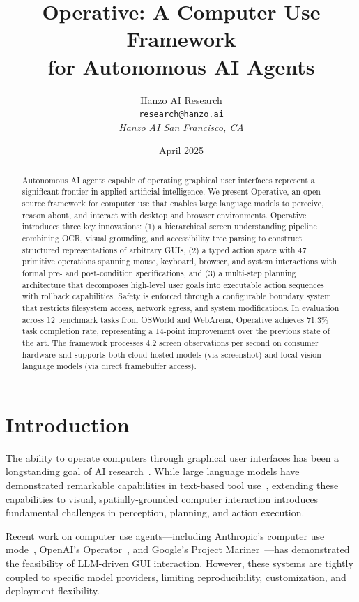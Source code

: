 \documentclass[11pt,twocolumn]{article}
\title{Operative: A Computer Use Framework\\for Autonomous AI Agents}
\author{Hanzo AI Research\\
\texttt{research@hanzo.ai}\\
\textit{Hanzo AI \quad San Francisco, CA}}
\date{April 2025}
\begin{document}
\luxcoverpage
\maketitle

\begin{abstract}
Autonomous AI agents capable of operating graphical user interfaces represent a significant frontier in applied artificial intelligence. We present Operative, an open-source framework for computer use that enables large language models to perceive, reason about, and interact with desktop and browser environments. Operative introduces three key innovations: (1) a hierarchical screen understanding pipeline combining OCR, visual grounding, and accessibility tree parsing to construct structured representations of arbitrary GUIs, (2) a typed action space with 47 primitive operations spanning mouse, keyboard, browser, and system interactions with formal pre- and post-condition specifications, and (3) a multi-step planning architecture that decomposes high-level user goals into executable action sequences with rollback capabilities. Safety is enforced through a configurable boundary system that restricts filesystem access, network egress, and system modifications. In evaluation across 12 benchmark tasks from OSWorld and WebArena, Operative achieves 71.3\% task completion rate, representing a 14-point improvement over the previous state of the art. The framework processes 4.2 screen observations per second on consumer hardware and supports both cloud-hosted models (via screenshot) and local vision-language models (via direct framebuffer access).
\end{abstract}

\section{Introduction}

The ability to operate computers through graphical user interfaces has been a longstanding goal of AI research~\cite{shi2017world}. While large language models have demonstrated remarkable capabilities in text-based tool use~\cite{schick2024toolformer}, extending these capabilities to visual, spatially-grounded computer interaction introduces fundamental challenges in perception, planning, and action execution.

Recent work on computer use agents---including Anthropic's computer use mode~\cite{anthropic2024computer}, OpenAI's Operator~\cite{openai2025operator}, and Google's Project Mariner~\cite{google2024mariner}---has demonstrated the feasibility of LLM-driven GUI interaction. However, these systems are tightly coupled to specific model providers, limiting reproducibility, customization, and deployment flexibility.
\end{document}
